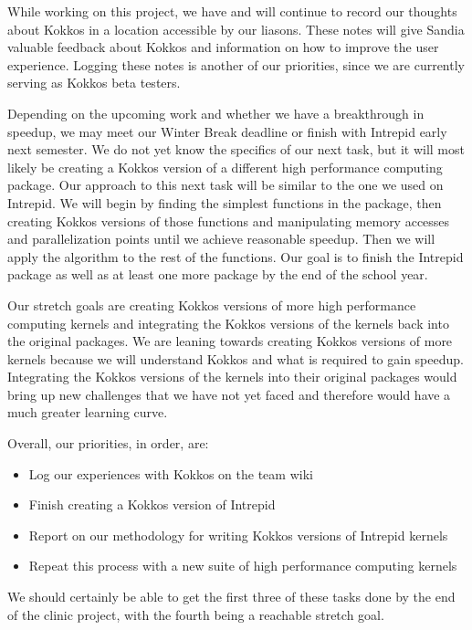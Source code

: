 \documentclass[midyear]{hmcclinic}
\begin{document}
While working on this project, we have and will continue to record our thoughts
about Kokkos in a location accessible by our liasons.  These notes will give
Sandia valuable feedback about Kokkos and information on how to improve the user
experience. Logging these notes is another of our priorities, since we are
currently serving as Kokkos beta testers. 

Depending on the upcoming work and whether we have a breakthrough in speedup,
we may meet our Winter Break deadline or finish with Intrepid early next
semester. We do not yet know the specifics of our next task, but it will most
likely be creating a Kokkos version of a different high performance computing
package.  Our approach to this next task will be similar to the one we used on
Intrepid. We will begin by finding the simplest functions in the package, then
creating Kokkos versions of those functions and manipulating memory accesses and
parallelization points until we achieve reasonable speedup. Then we will apply
the algorithm to the rest of the functions. Our goal is to finish the Intrepid
package as well as at least one more package by the end of the school year. 

Our stretch goals are creating Kokkos versions of more high performance
computing kernels and integrating the Kokkos versions of the kernels back into
the original packages. We are leaning towards creating Kokkos versions of more
kernels because we will understand Kokkos and what is required to gain speedup.
Integrating the Kokkos versions of the kernels into their original packages
would bring up new challenges that we have not yet faced and therefore would
have a much greater learning curve. 

Overall, our priorities, in order, are: 
\begin{itemize}
	\item Log our experiences with Kokkos on the team wiki
	
	\item Finish creating a Kokkos version of Intrepid

	\item Report on our methodology for writing Kokkos versions of Intrepid
            kernels
	
        \item Repeat this process with a new suite of high performance computing
            kernels
\end{itemize}
We should certainly be able to get the first three of these tasks done by the
end of the clinic project, with the fourth being a reachable stretch goal.
\end{document}

